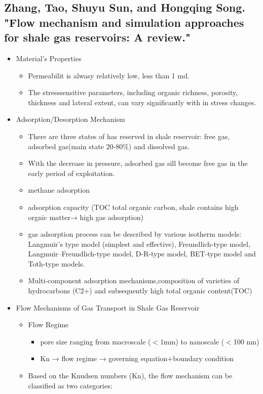 \subsection{Zhang, Tao, Shuyu Sun, and Hongqing Song. "Flow mechanism and simulation approaches for shale gas reservoirs: A review."  \citep{zhang2019flow}}
\begin{itemize}
\item Material’s Properties
\begin{itemize}
\item Permeabilit is alwasy relatively low, less than 1 md.
\item The stresssensitive parameters, including organic richness, porosity, thickness and lateral extent, can vary significantly with in stress changes.
\end{itemize}
\item Adsorption/Desorption Mechanism
\begin{itemize}
\item There are three states of has reserved in shale reservoir: free gas, adsorbed gas(main state 20-80\%) and dissolved gas.
\item With the decrease in pressure, adsorbed gas sill become free gas in the early period of exploitation.
\item methane adsorption
\item adsorption capacity (TOC total organic carbon, shale contains high orgnic matter→ high gas adsorption)
\item gas adsorption process can be described by various isotherm models: Langmuir’s type model (simplest and effective), Freundlich-type model, Langmuir–Freundlich-type model, D-R-type model, BET-type model and Toth-type models.
\item Multi-component adsorption mechanisms,composition of varieties of hydrocarbons (C2+) and subsequently high total organic content(TOC)
\end{itemize}
\item Flow Mechanisms of Gas Transport in Shale Gas Reservoir
\begin{itemize}
\item Flow Regime
\begin{itemize}
\item pore size ranging from macroscale ($<$1mm) to nanoscale ($<$100 nm)
\item Kn → flow regime → governing equation+boundary condition
\end{itemize}
\item  Based on the Knudsen numbers (Kn), the flow mechanism can be classified as two categories:

\end{itemize}
\end{itemize}
